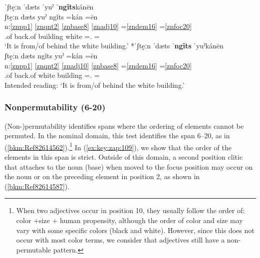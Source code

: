 \documentclass[output=paper]{langscibook}
\begin{document}
\newpage
\ea\label{ex:key:zap:106}
{ˈʃtḛːn ˈdæts ˈyuˀ ˈ\textbf{ngǐts}kánēn}\\
\glll ʃtḛːn dæts yuˀ ngǐts =kán =ēn\\
n:\ref{znpp1} \ref{znqnt2} \ref{znbase8} \ref{znadj10} =\ref{zndem16} =\ref{znfoc20}\\
\Prep{}.of back.of   building white =\Dem.\Med{} =\Foc{}\\
\glt `It is from/of behind the white building.'
\ex\label{bkm:Ref82614415}
{*ˈʃtḛːn ˈdæts   ˈ\textbf{ngǐts}   ˈyuˀkánēn}\\
\glll ʃtḛːn dæts ngǐts   yuˀ =kán =ēn\\
n:\ref{znpp1} \ref{znqnt2} \ref{znadj10} \ref{znbase8} =\ref{zndem16} =\ref{znfoc20} \\
\Prep{}.of back.of   white building =\Dem.\Med{} =\Foc{}\\
\glt Intended reading: `It is from/of behind the white building.'
\z

\subsubsection{Nonpermutability (6-20)}

(Non-)permutability identifies spans where the ordering of elements cannot be permuted. In the nominal domain, this test identifies the span 6–20, as in (\ref{bkm:Ref82614562}).\footnote{When two adjectives occur in position 10, they usually follow the order of: color +size + human propensity, although the order of color and size may vary with some specific colors (black and white). However, since this does not occur with most color terms, we consider that adjectives still have a non-permutable pattern.} In (\ref{ex:key:zap:109}), we show that the order of the elements in this span is strict. Outside of this domain, a second position clitic that attaches to the noun (base) when moved to the focus position may occur on the noun or on the preceding element in position 2, as shown in (\ref{bkm:Ref82614587}).
\end{document}
